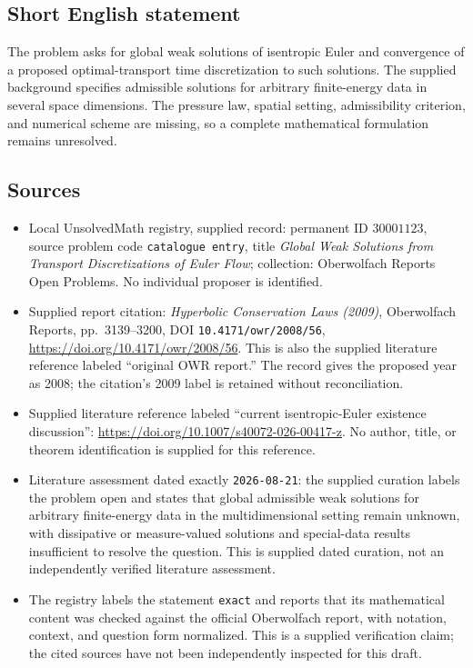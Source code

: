 \documentclass[11pt]{article}
\begin{document}
\subsection{Short English statement}
The problem asks for global weak solutions of isentropic Euler and convergence of a proposed optimal-transport time discretization to such solutions. The supplied background specifies admissible solutions for arbitrary finite-energy data in several space dimensions. The pressure law, spatial setting, admissibility criterion, and numerical scheme are missing, so a complete mathematical formulation remains unresolved.
\subsection{Sources}
\begin{itemize}
\item Local UnsolvedMath registry, supplied record: permanent ID \(30001123\), source problem code \texttt{catalogue entry}, title \emph{Global Weak Solutions from Transport Discretizations of Euler Flow}; collection: Oberwolfach Reports Open Problems. No individual proposer is identified.
\item Supplied report citation: \emph{Hyperbolic Conservation Laws (2009)}, Oberwolfach Reports, pp.~3139--3200, DOI \texttt{10.4171/owr/2008/56}, \url{https://doi.org/10.4171/owr/2008/56}. This is also the supplied literature reference labeled ``original OWR report.'' The record gives the proposed year as 2008; the citation's 2009 label is retained without reconciliation.
\item Supplied literature reference labeled ``current isentropic-Euler existence discussion'': \url{https://doi.org/10.1007/s40072-026-00417-z}. No author, title, or theorem identification is supplied for this reference.
\item Literature assessment dated exactly \texttt{2026-08-21}: the supplied curation labels the problem open and states that global admissible weak solutions for arbitrary finite-energy data in the multidimensional setting remain unknown, with dissipative or measure-valued solutions and special-data results insufficient to resolve the question. This is supplied dated curation, not an independently verified literature assessment.
\item The registry labels the statement \texttt{exact} and reports that its mathematical content was checked against the official Oberwolfach report, with notation, context, and question form normalized. This is a supplied verification claim; the cited sources have not been independently inspected for this draft.
\end{itemize}
\end{document}
